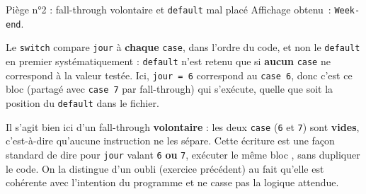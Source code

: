 \begin{UPSTIprofOnlyEnv}
    \begin{UPSTIcorrectionP}{Piège n°2 : fall-through volontaire et \texttt{default} mal placé}
        Affichage obtenu~: \texttt{Week-end}.

        Le \texttt{switch} compare \texttt{jour} à \textbf{chaque} \texttt{case}, dans l'ordre du code, et non le \texttt{default} en premier systématiquement : \texttt{default} n'est retenu que si \textbf{aucun} \texttt{case} ne correspond à la valeur testée. Ici, \texttt{jour = 6} correspond au \texttt{case 6}, donc c'est ce bloc (partagé avec \texttt{case 7} par fall-through) qui s'exécute, quelle que soit la position du \texttt{default} dans le fichier.

        Il s'agit bien ici d'un fall-through \textbf{volontaire} : les deux \texttt{case} (\texttt{6} et \texttt{7}) sont \textbf{vides}, c'est-à-dire qu'aucune instruction ne les sépare. Cette écriture est une façon standard de dire \og pour \texttt{jour} valant \texttt{6} \textbf{ou} \texttt{7}, exécuter le même bloc \fg, sans dupliquer le code. On la distingue d'un oubli (exercice précédent) au fait qu'elle est cohérente avec l'intention du programme et ne casse pas la logique attendue.
    \end{UPSTIcorrectionP}
\end{UPSTIprofOnlyEnv}
